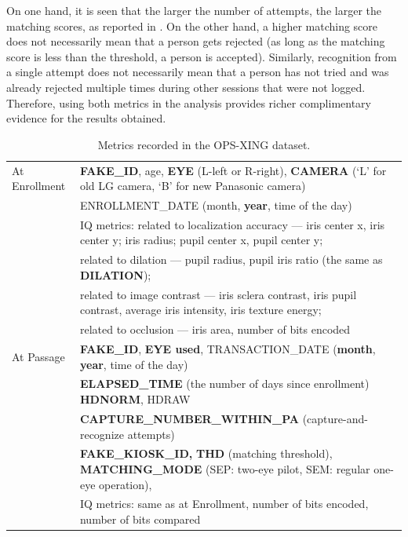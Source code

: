 \documentclass{cta-author}%
\begin{document}
On one hand, it is seen that the larger the number of attempts, the larger the matching scores, as reported in \cite{Bowyer-attempts}.
On the other hand, a higher matching score does not necessarily mean that a person gets rejected (as long as the matching score is less than the threshold, a person is accepted). Similarly, recognition from a single attempt does not necessarily mean that a person has not tried and was already rejected multiple times during other sessions that were not logged. 
Therefore, using both metrics in the analysis  provides richer complimentary evidence for the results obtained.



\begin{table}[!t]
	\caption{Metrics recorded in the OPS-XING dataset. 	
	\label{MetricsRecordedAtOPSXINGDataSet}}


\begin{small}

		\begin{tabular} { l | l }
		\hline
			At Enrollment & 
			\textbf{FAKE\_ID}, age, %
\textbf{EYE} (L-left or R-right), 
\textbf{CAMERA }(`L' for old LG camera, `B' for new Panasonic camera) \\ 
& ENROLLMENT\_DATE (month, \textbf{year}, time of the day)
\\ 
& IQ metrics:  related to localization accuracy --- 
			iris center x,   iris center y; 			 iris radius; 	pupil center x,  pupil center y; 
			\\ 			& 
\quad related to dilation ---  
pupil radius,   
pupil iris ratio  (the same as \textbf{DILATION});		
			\\ 			& 		
\quad related to image contrast --- 
iris sclera contrast,
	iris pupil contrast, 
	average iris intensity, 
	iris texture energy;    
			\\ 			& 
\quad related to  occlusion --- 
iris area,     
	number of bits encoded   
\\ \hline
				At Passage & 
				\textbf{FAKE\_ID},
\textbf{EYE used},
TRANSACTION\_DATE (\textbf{month}, \textbf{year}, time of the day) \\ 			& 
\textbf{ELAPSED\_TIME} (the number of days since enrollment) 
\textbf{HDNORM}, HDRAW 
		\\ 			& 
\textbf{CAPTURE\_NUMBER\_WITHIN\_PA} (capture-and-recognize attempts)
			\\ 			& 
\textbf{FAKE\_KIOSK\_ID,}
\textbf{THD} (matching threshold), 	
\textbf{MATCHING\_MODE} (SEP: two-eye pilot, SEM: regular one-eye operation), 
							\\ 			& 
				IQ metrics: same as at Enrollment,
				number of bits encoded, number of bits compared 
				\\	
				\hline
		\end{tabular}


\end{small}
\end{table}
\end{document}
